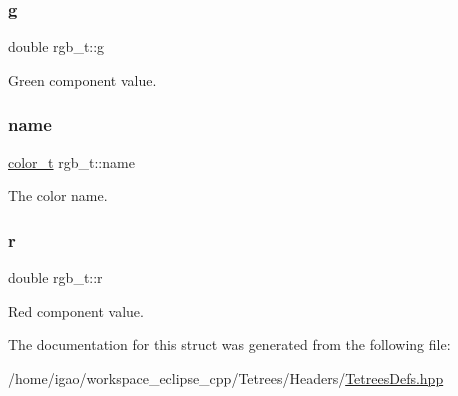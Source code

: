 \subsubsection{\texorpdfstring{g}{g}}
{\footnotesize\ttfamily double rgb\+\_\+t\+::g}

Green component value. \mbox{\label{structrgb__t_a98fbae1e6897105536340238b9660ba5}} 
\subsubsection{\texorpdfstring{name}{name}}
{\footnotesize\ttfamily \hyperlink{TetreesDefs_8hpp_a8ba5fbce2446135735693ab60c896bbd}{color\+\_\+t} rgb\+\_\+t\+::name}

The color name. \mbox{\label{structrgb__t_a89e46e1937cafe0683023100a5e1915a}} 
\subsubsection{\texorpdfstring{r}{r}}
{\footnotesize\ttfamily double rgb\+\_\+t\+::r}

Red component value. 

The documentation for this struct was generated from the following file\+:\begin{DoxyCompactItemize}
\item 
/home/igao/workspace\+\_\+eclipse\+\_\+cpp/\+Tetrees/\+Headers/\hyperlink{TetreesDefs_8hpp}{Tetrees\+Defs.\+hpp}\end{DoxyCompactItemize}
